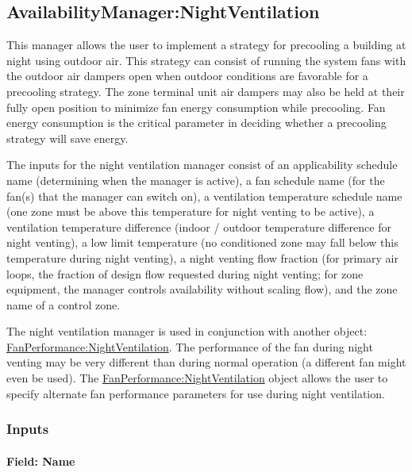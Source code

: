\subsection{AvailabilityManager:NightVentilation}\label{availabilitymanagernightventilation}

This manager allows the user to implement a strategy for precooling a building at night using outdoor air. This strategy can consist of running the system fans with the outdoor air dampers open when outdoor conditions are favorable for a precooling strategy. The zone terminal unit air dampers may also be held at their fully open position to minimize fan energy consumption while precooling. Fan energy consumption is the critical parameter in deciding whether a precooling strategy will save energy.

The inputs for the night ventilation manager consist of an applicability schedule name (determining when the manager is active), a fan schedule name (for the fan(s) that the manager can switch on), a ventilation temperature schedule name (one zone must be above this temperature for night venting to be active), a ventilation temperature difference (indoor / outdoor temperature difference for night venting), a low limit temperature (no conditioned zone may fall below this temperature during night venting), a night venting flow fraction (for primary air loops, the fraction of design flow requested during night venting; for zone equipment, the manager controls availability without scaling flow), and the zone name of a control zone.

The night ventilation manager is used in conjunction with another object: \hyperref[fanperformancenightventilation]{FanPerformance:NightVentilation}. The performance of the fan during night venting may be very different than during normal operation (a different fan might even be used). The \hyperref[fanperformancenightventilation]{FanPerformance:NightVentilation} object allows the user to specify alternate fan performance parameters for use during night ventilation.

\subsubsection{Inputs}\label{inputs-9-023}

\paragraph{Field: Name}\label{field-name-8-021}

